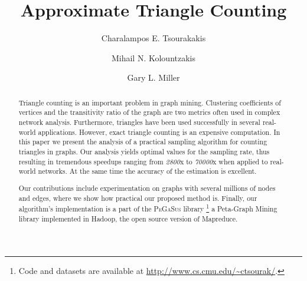\documentclass{llncs}
\newcommand{\pegasus}{\textsc{PeGaSus}\xspace}
\begin{document}
\mainmatter    

\title{Approximate Triangle Counting}

\author{Charalampos E. Tsourakakis \and Mihail N. Kolountzakis 
\and Gary L. Miller
}


\maketitle

\begin{abstract}
Triangle counting is an important problem in graph mining. Clustering coefficients of vertices and the transitivity ratio of the graph
are two metrics often used in complex network analysis. Furthermore, triangles have been used successfully in several real-world applications.
However, exact triangle counting is an expensive computation. 
In this paper we present the analysis of a practical sampling algorithm for counting triangles in graphs. 
Our analysis yields optimal values for the sampling rate, thus resulting in tremendous speedups ranging from \emph{2800}x to \emph{70000}x when applied to real-world networks.
At the same time the accuracy of the estimation is excellent.

Our contributions include experimentation on graphs with several millions of nodes and edges, where we show how practical our proposed method is. 
Finally, our algorithm's implementation is a part of the \pegasus library \footnote{Code and datasets are available at \url{http://www.cs.cmu.edu/~ctsourak/}.}
a Peta-Graph Mining library implemented in Hadoop, the open source version of Mapreduce. 

\end{abstract}
\end{document}
